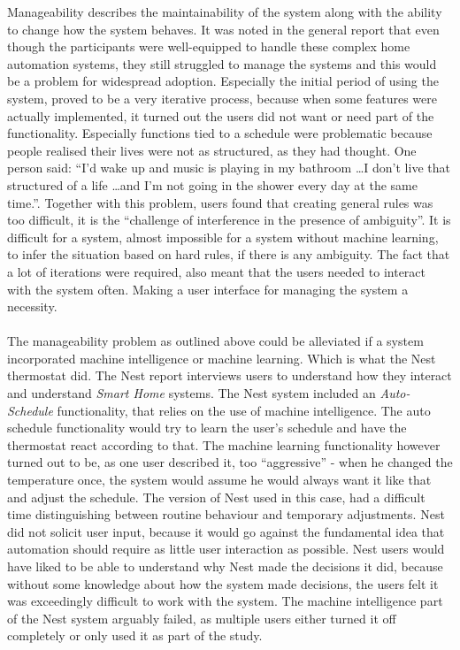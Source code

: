 Manageability describes the maintainability of the system along with the ability
to change how the system behaves. It was noted in the general report that even though the participants were well-equipped to handle these complex home automation systems, they still struggled to manage the systems and this would be a problem for widespread adoption. Especially the initial period of using the system, proved to be a very iterative process, because when some features were actually implemented, it turned out the users did not want or need part of the functionality. Especially functions tied to a schedule were problematic because people realised their lives were not as structured, as they had thought. One person said: \enquote{I'd wake up and music is playing in my bathroom \ldots I don't live that structured of a life \ldots and I'm not going in the shower every day at the same time.}. Together with this problem, users found that creating general rules was too difficult, it is the \enquote{challenge of interference in the presence of ambiguity}\cite{HAInterviews}. It is difficult for a system, almost impossible for a system without machine learning, to infer the situation based on hard rules, if there is any ambiguity. The fact that a lot of iterations were required, also meant that the users needed to interact with the system often. Making a user interface for managing the system a necessity.
\\\\
The manageability problem as outlined above could be alleviated if a system incorporated machine intelligence or machine learning. Which is what the Nest thermostat did. The Nest report interviews users to understand how they interact and understand \emph{Smart Home} systems. The Nest system included an \emph{Auto-Schedule} functionality, that relies on the use of machine intelligence. The auto schedule functionality would try to learn the user's schedule and have the thermostat react according to that. The machine learning functionality however turned out to be, as one user described it, too \enquote{aggressive}\cite{AdaptiveInterviews} - when he changed the temperature once, the system would assume he would always want it like that and adjust the schedule. The version of Nest used in this case, had a difficult time distinguishing between routine behaviour and temporary adjustments. Nest did not solicit user input, because it would go against the fundamental idea that automation should require as little user interaction as possible. Nest users would have liked to be able to understand why Nest made the decisions it did, because without some knowledge about how the system made decisions, the users felt it was exceedingly difficult to work with the system. The machine intelligence part of the Nest system arguably failed, as multiple users either turned it off completely or only used it as part of the study.

